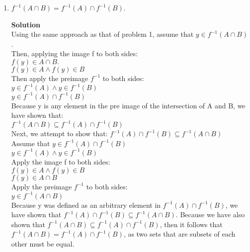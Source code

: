 \documentclass[11pt]{article}
\begin{document}
\begin{enumerate}
\pagebreak
\item $f^{-1}(A \cap B) = f^{-1}(A) \cap f^{-1}(B)$.
\begin{mdframed} \textbf{Solution} \\
Using the same approach as that of problem 1, assume that $y \in f^{-1}(A \cap B)$. \\
Then, applying the image f to both sides: \\
$f(y) \in A \cap B.$ \\
$f(y) \in A \land f(y) \in B$ \\
Then apply the preimage $f^{-1}$ to both sides: \\
$y \in f^{-1}(A) \land y \in f^{-1}(B)$ \\
$y \in f^{-1}(A) \cap f^{-1}(B)$ \\
Because y is any element in the pre image of the intersection of A and B, we have shown that: \\
$f^{-1}(A \cap B) \subseteq f^{-1}(A) \cap f^{-1}(B)$ \\
Next, we attempt to show that:
$f^{-1}(A) \cap f^{-1}(B) \subseteq f^{-1}(A \cap B)$ \\
Assume that $y \in f^{-1}(A) \cap f^{-1}(B)$ \\
$y \in f^{-1}(A) \land y \in f^{-1}(B)$ \\
Apply the image f to both sides: \\
$f(y) \in A \land f(y) \in B$ \\
$f(y) \in A \cap B$ \\
Apply the preimage $f^{-1}$ to both sides: \\
$y \in f^{-1}(A \cap B)$ \\
Because y was defined as an arbitrary element in $f^{-1}(A) \cap f^{-1}(B)$, we have shown that $f^{-1}(A) \cap f^{-1}(B) \subseteq f^{-1}(A \cap B)$. Because we have also shown that $f^{-1}(A \cap B) \subseteq f^{-1}(A) \cap f^{-1}(B)$, then it follows that $f^{-1}(A \cap B) = f^{-1}(A) \cap f^{-1}(B)$, as two sets that are subsets of each other must be equal.
\end{mdframed}


\end{enumerate}
\end{document}
